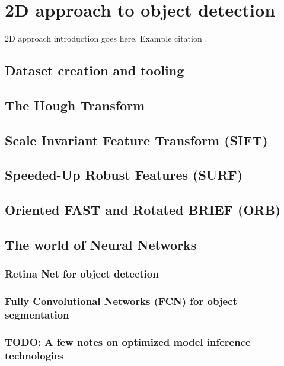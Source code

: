 \documentclass[../main.tex]{subfiles}
\begin{document}
\section{2D approach to object detection} \label{sec:2D_approach}
2D approach introduction goes here. Example citation \cite{deep_learning_IGoodfellow}.


\subsection{Dataset creation and tooling}

\subsection{The Hough Transform}

\subsection{Scale Invariant Feature Transform (SIFT)}

\subsection{Speeded-Up Robust Features (SURF)}

\subsection{Oriented FAST and Rotated BRIEF (ORB)}

\subsection{The world of Neural Networks} \label{sec:world_neural_networks}

\subsubsection{Retina Net for object detection}

\subsubsection{Fully Convolutional Networks (FCN) for object segmentation}

\subsubsection{TODO: A few notes on optimized model inference technologies}
\end{document}
